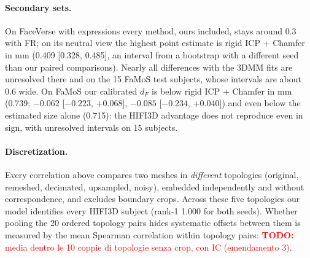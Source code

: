 \documentclass[10pt,twocolumn,letterpaper]{article}
\newcommand{\todo}[1]{\textcolor{red}{\textbf{TODO:} #1}}
\begin{document}
\paragraph{Secondary sets.} On FaceVerse with expressions every method, ours included, stays around 0.3 with FR; on its neutral view the highest point estimate is rigid ICP + Chamfer in mm (0.409 [0.328, 0.485], an interval from a bootstrap with a different seed than our paired comparisons). Nearly all differences with the 3DMM fits are unresolved there and on the 15 FaMoS test subjects, whose intervals are about 0.6 wide. On FaMoS our calibrated $d_F$ is below rigid ICP + Chamfer in mm (0.739; $-0.062$ [$-0.223$, $+0.068$], $-0.085$ [$-0.234$, $+0.040$]) and even below the estimated size alone (0.715): the HIFI3D advantage does not reproduce even in sign, with unresolved intervals on 15 subjects.

\paragraph{Discretization.} Every correlation above compares two meshes in \emph{different} topologies (original, remeshed, decimated, upsampled, noisy), embedded independently and without correspondence, and excludes boundary crops. Across these five topologies our model identifies every HIFI3D subject (rank-1 1.000 for both seeds). Whether pooling the 20 ordered topology pairs hides systematic offsets between them is measured by the mean Spearman correlation within topology pairs: \todo{media dentro le 10 coppie di topologie senza crop, con IC (emendamento 3)}.
\end{document}
